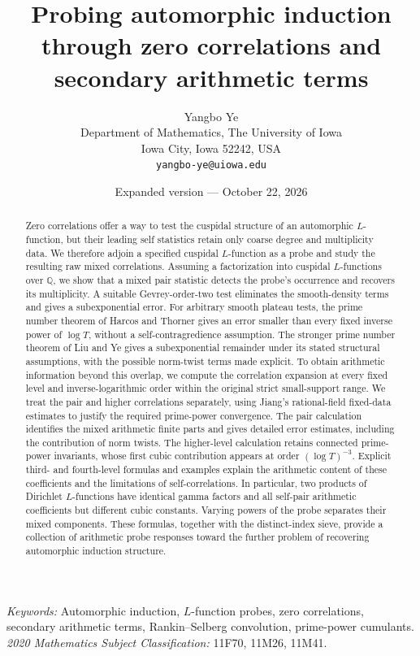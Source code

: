 \documentclass[11pt]{article}
\title{Probing automorphic induction\\through zero correlations and secondary arithmetic terms}
\author{Yangbo Ye\\[4pt]
\small Department of Mathematics, The University of Iowa\\
\small Iowa City, Iowa 52242, USA\\
\small \texttt{yangbo-ye@uiowa.edu}}
\date{Expanded version --- October 22, 2026}
\numberwithin{equation}{section}
\theoremstyle{remark}
\newcommand{\Q}{\mathbb Q}
\begin{document}
\maketitle
\begin{abstract}
Zero correlations offer a way to test the cuspidal structure of an
automorphic $L$-function, but their leading self statistics retain
only coarse degree and multiplicity data. We therefore adjoin a
specified cuspidal $L$-function as a probe and study the resulting raw
mixed correlations. Assuming a factorization into cuspidal
$L$-functions over $\Q$, we show that a mixed pair statistic detects
the probe's occurrence and recovers its multiplicity. A suitable
Gevrey-order-two test eliminates the smooth-density terms and gives
a subexponential error. For arbitrary smooth plateau tests, the
prime number theorem of Harcos and Thorner gives an error smaller
than every fixed inverse power of $\log T$, without a
self-contragredience assumption. The stronger prime number theorem
of Liu and Ye gives a subexponential remainder under its stated
structural assumptions, with the possible norm-twist terms made
explicit. To obtain arithmetic information beyond this
overlap, we compute the correlation expansion at every fixed level
and inverse-logarithmic order within the original strict
small-support range. We treat the pair and higher correlations separately,
using Jiang's rational-field fixed-data estimates to justify the
required prime-power convergence. The pair calculation identifies
the mixed arithmetic finite parts and gives detailed error estimates,
including the contribution of norm twists. The higher-level
calculation retains connected prime-power invariants, whose first
cubic contribution appears at order $(\log T)^{-3}$. Explicit third-
and fourth-level formulas and examples explain the arithmetic
content of these coefficients and the limitations of self-correlations.
In particular, two products of Dirichlet $L$-functions have identical
gamma factors and all self-pair arithmetic coefficients but different
cubic constants. Varying powers of the probe separates
their mixed components. These formulas, together with the
distinct-index sieve, provide a collection of arithmetic probe
responses toward the further problem of recovering automorphic
induction structure.
\end{abstract}
\noindent\textit{Keywords:} Automorphic induction, $L$-function probes,
zero correlations, secondary arithmetic terms, Rankin--Selberg convolution,
prime-power cumulants.\\
\textit{2020 Mathematics Subject Classification:} 11F70, 11M26, 11M41.
\end{document}
